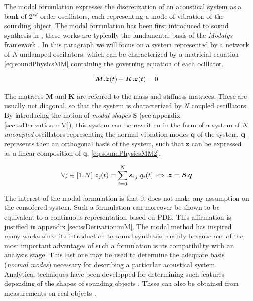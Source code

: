 {{					
					\label{subsubsubsubsec:CM_SS_Physics_SO_ModalSynthesis}

The modal formulation expresses the discretization of an acoustical system as a bank of 2$^{nd}$ order oscillators, each representing a mode of vibration of the sounding object. The modal formulation has been first introduced to sound synthesis in , these works are typically the fundamental basis of the \emph{Modalys} framework . In this paragraph we will focus on a system represented by a network of $N$ undamped oscillators, which can be characterized by a matricial equation \myequname \eqref{eq:soundPhysicsMM} containing the governing equation of each ocillator.

\begin{equation}
	\boldsymbol{M} . \ddot{\boldsymbol{z}}(t) + \boldsymbol{K} . \boldsymbol{z}(t) = 0
	\label{eq:soundPhysicsMM}
	\eqcaption{Modal synthesis formulation}
\end{equation}

The matrices $\boldsymbol{M}$ and $\boldsymbol{K}$ are referred to the mass and stiffness matrices. These are usually not diagonal, so that the system is characterized by $N$ coupled oscillators. By introducing the notion of \emph{modal shapes} $\boldsymbol{S}$ (see appendix \ref{sec:ssDerivation:mM}), this system can be rewritten in the form of a system of $N$ \emph{uncoupled} oscillators representing the normal vibration modes $\boldsymbol{q}$ of the system. $\boldsymbol{q}$ represents then an orthogonal basis of the system, such that $\boldsymbol{z}$ can be expressed as a linear composition of $\boldsymbol{q}$, \myequname \eqref{eq:soundPhysicsMM2}.

\begin{equation}
	\forall j \in [1, N]\ z_j(t) = \sum_{i = 0}^{N} s_{i, j} . q_i(t)\ \Leftrightarrow \ \boldsymbol{z} = \boldsymbol{S} . \boldsymbol{q}
	\label{eq:soundPhysicsMM2}
	\eqcaption{Modal synthesis formulation, linear combination of normal modes}
\end{equation}

The interest of the modal formulation is that it does not make any assumption on the considered system. Such a formulation can moreover be shown to be equivalent to a continuous representation based on PDE. This affirmation is justified in appendix \ref{sec:ssDerivation:mM}. The modal method has inspired many works since its introduction to sound synthesis, mainly because one of the most important advantages of such a formulation is its compatibility with an analysis stage. This last one may be used to determine the adequate basis (\emph{normal modes}) necessary for describing a particular acoustical system. Analytical techniques have been developped for determining such features depending of the shapes of sounding objects . These can also be obtained from measurements on real objects .


}}
